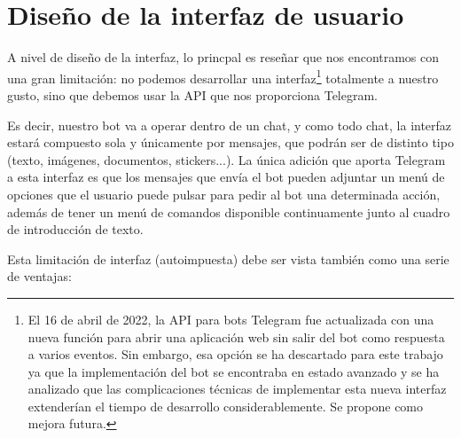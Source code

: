 \chapter{Diseño de la interfaz de usuario}

A nivel de diseño de la interfaz, lo princpal es reseñar que nos encontramos con una gran limitación: no podemos desarrollar una interfaz\footnote{El 16 de abril de 2022, la API para bots Telegram fue actualizada\cite{telegramWebappUpdate} con una nueva función para abrir una aplicación web sin salir del bot como respuesta a varios eventos. Sin embargo, esa opción se ha descartado para este trabajo ya que la implementación del bot se encontraba en estado avanzado y se ha analizado que las complicaciones técnicas de implementar esta nueva interfaz extenderían el tiempo de desarrollo considerablemente. Se propone como mejora futura.} totalmente a nuestro gusto, sino que debemos usar la API que nos proporciona Telegram.

Es decir, nuestro bot va a operar dentro de un chat, y como todo chat, la interfaz estará compuesto sola y únicamente por mensajes, que podrán ser de distinto tipo (texto, imágenes, documentos, stickers...). La única adición que aporta Telegram a esta interfaz es que los mensajes que envía el bot pueden adjuntar un menú de opciones que el usuario puede pulsar para pedir al bot una determinada acción, además de tener un menú de comandos disponible continuamente junto al cuadro de introducción de texto.

Esta limitación de interfaz (autoimpuesta) debe ser vista también como una serie de ventajas:

